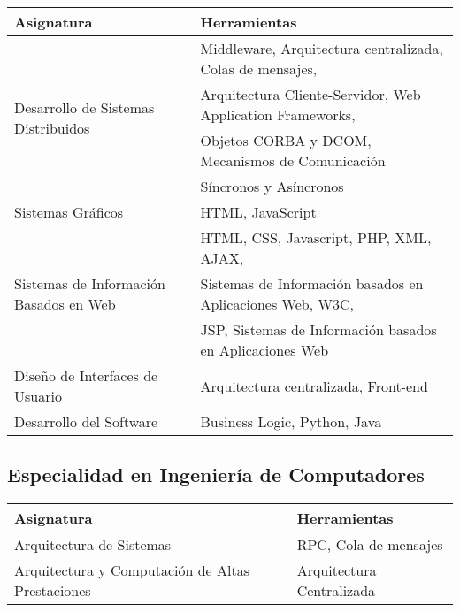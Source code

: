 \begin{center}
	\begin{tabular}{l|l}
		\textbf{Asignatura}                                     & \textbf{Herramientas} \\ \hline
		\multirow{4}{*}{Desarrollo de Sistemas Distribuidos}    & Middleware, Arquitectura centralizada, Colas de mensajes, \\
		                                                        & Arquitectura Cliente-Servidor, Web Application Frameworks, \\
																				  & Objetos CORBA y DCOM, Mecanismos de Comunicación \\
		                                                        & Síncronos y Asíncronos \\  \hline
		Sistemas Gráficos                                       & HTML, JavaScript \\  \hline
		\multirow{3}{*}{Sistemas de Información Basados en Web} & HTML, CSS, Javascript, PHP, XML, AJAX, \\
		                                                        & Sistemas de Información basados en Aplicaciones Web, W3C,\\
		                                                        & JSP, Sistemas de Información basados en Aplicaciones Web \\ \hline
		Diseño de Interfaces de Usuario                         & Arquitectura centralizada, Front-end \\  \hline
		Desarrollo del Software                                 & Business Logic, Python, Java
	\end{tabular}
\end{center}

\pagebreak

\subsection{Especialidad en Ingeniería de Computadores}

\begin{center}
	\begin{tabular}{l|l}
		\textbf{Asignatura}                              & \textbf{Herramientas} \\ \hline
		Arquitectura de Sistemas                         & RPC, Cola de mensajes \\  \hline
		Arquitectura y Computación de Altas Prestaciones & Arquitectura Centralizada
	\end{tabular}
\end{center}

